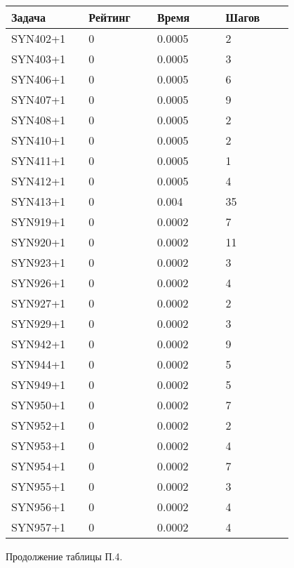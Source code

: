 \begin{longtable}[H]{|p{0.2\linewidth}|p{0.2\linewidth}|p{0.2\linewidth}|p{0.2\linewidth}|}
\hline
\textbf{Задача} & \textbf{Рейтинг} & \textbf{Время} & \textbf{Шагов} \\
\hline
SYN402+1 &  0 &  0.0005 &  2 \\
\hline
SYN403+1 &  0 &  0.0005 &  3 \\
\hline
SYN406+1 &  0 &  0.0005 &  6 \\
\hline
SYN407+1 &  0 &  0.0005 &  9 \\
\hline
SYN408+1 &  0 &  0.0005 &  2 \\
\hline
SYN410+1 &  0 &  0.0005 &  2 \\
\hline
SYN411+1 &  0 &  0.0005 &  1 \\
\hline
SYN412+1 &  0 &  0.0005 &  4 \\
\hline
SYN413+1 &  0 &  0.004 &  35 \\
\hline
SYN919+1 &  0 &  0.0002 &  7 \\
\hline
SYN920+1 &  0 &  0.0002 &  11 \\
\hline
SYN923+1 &  0 &  0.0002 &  3 \\
\hline
SYN926+1 &  0 &  0.0002 &  4 \\
\hline
SYN927+1 &  0 &  0.0002 &  2 \\
\hline
SYN929+1 &  0 &  0.0002 &  3 \\
\hline
SYN942+1 &  0 &  0.0002 &  9 \\
\hline
SYN944+1 &  0 &  0.0002 &  5 \\
\hline
SYN949+1 &  0 &  0.0002 &  5 \\
\hline
SYN950+1 &  0 &  0.0002 &  7 \\
\hline
SYN952+1 &  0 &  0.0002 &  2 \\
\hline
SYN953+1 &  0 &  0.0002 &  4 \\
\hline
SYN954+1 &  0 &  0.0002 &  7 \\
\hline
SYN955+1 &  0 &  0.0002 &  3 \\
\hline
SYN956+1 &  0 &  0.0002 &  4 \\
\hline
SYN957+1 &  0 &  0.0002 &  4 \\
\hline
\end{longtable}
\begin{center}
Продолжение таблицы П.4.
\end{center}

